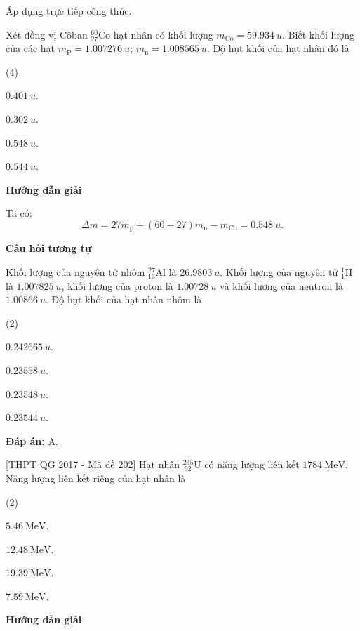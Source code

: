 \begin{dang}{Áp dụng trực tiếp công thức.}
	
	
	{
		Xét đồng vị Côban $ ^{60}_{27} \text{Co} $ hạt nhân có khối lượng $ m_{\text{Co}} = \SI{59,934}{u}$. Biết khối lượng của các hạt $ m_{\text{P}} = \SI{1,007276}{u} $; $ m_{\text{n}} = \SI{1,008565}{u} $. Độ hụt khối của hạt nhân đó là
		\begin{mcq}(4)
			\item $ \SI{0,401}{u} $.
			\item $ \SI{0,302}{u} $.
			\item $ \SI{0,548}{u} $.
			\item $ \SI{0,544}{u} $.
		\end{mcq} 
	}
	{
		\begin{center}
			\textbf{Hướng dẫn giải}
		\end{center}
		Ta có:
		$$
		\Delta m = 27 m_{\text{p}} + (60 - 27) m_{\text{n}} - m_{\text{Co}} = \SI{0,548}{u}.
		$$
		
		\begin{center}
			\textbf{Câu hỏi tương tự}
		\end{center}
		Khối lượng của nguyên tử nhôm $ ^{27}_{13} \text{Al} $ là $ \SI{26,9803}{u} $. Khối lượng của nguyên tử $ ^{1}_{1} \text{H} $ là $ \SI{1,007825}{u} $, khối lượng của proton là $ \SI{1,00728}{u} $ và khối lượng của neutron là $ \SI{1,00866}{u} $. Độ hụt khối của hạt nhân nhôm là
		\begin{mcq}(2)
			\item $ \SI{0,242665}{u} $.
			\item $ \SI{0,23558}{u} $.
			\item $ \SI{0,23548}{u} $.
			\item $ \SI{0,23544}{u} $.
		\end{mcq}
		\textbf{Đáp án:} A.
	}
	
	{	[THPT QG 2017 - Mã đề 202]  Hạt nhân $^{235}_{\ 92}\text{U}$ có năng lượng liên kết $\SI{1784}{\mega\electronvolt}$. Năng lượng liên kết riêng của hạt nhân là
		\begin{mcq}(2)
			\item $\SI{5,46}{\mega\electronvolt}$.
			\item $\SI{12,48}{\mega\electronvolt}$.
			\item $\SI{19,39}{\mega\electronvolt}$.
			\item $\SI{7,59}{\mega\electronvolt}$.
	\end{mcq}}
	{
		\begin{center}
			\textbf{Hướng dẫn giải}
		\end{center}
		
}
\end{dang}
